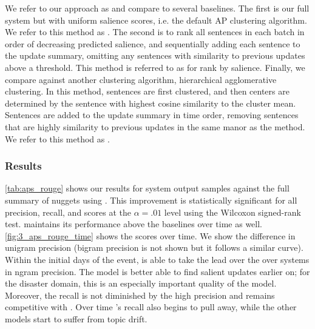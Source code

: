     We refer to our approach as \sap{} and compare to 
    several 
    baselines.
    The first is our full system but with uniform salience scores, i.e.
    the default AP clustering algorithm. We refer to
    this method as \ap.
    The second is to rank all sentences in each batch in order of decreasing
    predicted
    salience, and sequentially adding each sentence to the update summary, 
    omitting
    any sentences with similarity to previous updates above a threshold.
    This method is referred to as \ranksal{} for rank by salience.
    Finally, we compare against another clustering algorithm,
    hierarchical agglomerative clustering.
    In this method, sentences are first clustered, 
    and then centers are determined by the sentence
    with  highest  cosine  similarity  to  the  cluster
    mean. 
    Sentences are added to the update summary in time order, 
    removing sentences that are highly similarity to previous updates in the
    same manor as the \ranksal{} method. We refer to this method as 
    \hac.





    \subsubsection{Results}

\autoref{tab:aps_rouge}  shows  our  results  for  system  output
samples against the full summary of nuggets using \rouge. 
This improvement is statistically significant  for  all  \ngram{}
precision,  recall,  and \fmeasure{} scores at the
$\alpha=.01$
level using the Wilcoxon
signed-rank test.
\sap{}
maintains    its    performance
above  the  baselines  over  time  as  well.
\autoref{fig:3_aps_rouge_time}  shows  the    scores  over  
time.
We  show  the  difference  in  unigram  precision
(bigram  precision  is  not  shown  but  it  follows a
similar  curve).
Within  the  initial  days  of  the
event,  \sap{}
is  able  to  take  the  lead
over  the  over  systems  in  ngram  precision.   The
\sap{}
model is better able to find salient
updates earlier on; for the disaster domain, this is
an especially important quality of the model.
Moreover, the \sap{} recall is not diminished by the high 
precision and remains competitive with \ap. 
Over time \sap's recall also begins to pull away, 
while the other models start to suffer from topic drift.


